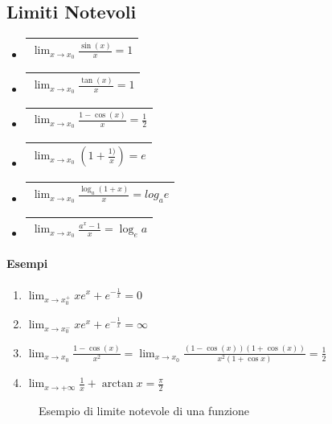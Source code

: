\subsection{Limiti Notevoli}
\begin{multicols}{2}
	\begin{itemize}
		\item \begin{tabular}{|l|}
				\hline
				$\lim_{x\to x_0}\frac{\sin (x)}{x}=1$\\\hline
		\end{tabular}
		\item \begin{tabular}{|l|}
				\hline
				$\lim_{x\to x_0}\frac{\tan (x)}{x}=1$\\\hline
		\end{tabular}
		\item \begin{tabular}{|l|}
				\hline
				$\lim_{x\to x_0}\frac{1-\cos (x)}{x}=\frac{1}{2}$\\\hline
		\end{tabular}
		\item \begin{tabular}{|l|}
				\hline
				$\lim_{x\to x_0}(1+\frac{1)}{x})=e$\\\hline
		\end{tabular}
		\item \begin{tabular}{|l|}
				\hline
				$\lim_{x\to x_0}\frac{\log_a (1+x)}{x}=log_ae$\\\hline
		\end{tabular}
		\item \begin{tabular}{|l|}
				\hline
				$\lim_{x\to x_0}\frac{a^x-1}{x}=\log_ea$\\\hline
		\end{tabular}
	\end{itemize}
\end{multicols}
\paragraph{Esempi}
\begin{multicols}{2}
	\begin{enumerate}
		\item $\lim_{x\to x_0^+}xe^x+e^{-\frac{1}{x}}=0$
		\item $\lim_{x\to x_0^-}xe^x+e^{-\frac{1}{x}}=\infty$
		\item $\lim_{x\to x_0}\frac{1-\cos (x)}{x^2}=\lim_{x\to
			x_0}\frac{(1-\cos (x))(1+\cos (x))}{x^2(1+\cos x)}=\frac{1}{2}$
		\item $\lim_{x\to +\infty}\frac{1}{x}+\arctan{x}=\frac{\pi}{2}$
	\end{enumerate}
\end{multicols}
\begin{figure}[!ht]
	\centering
	\caption{Esempio di limite notevole di una funzione}
\end{figure}

